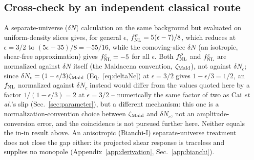\documentclass[aps,prd,twocolumn,superscriptaddress,nofootinbib,longbibliography]{revtex4-2}
\begin{document}
\subsection{Cross-check by an independent classical route}
\label{sec:crosscheck}

A separate-universe ($\delta N$) calculation on the same background but evaluated
on uniform-density slices gives, for general $\epsilon$,
$f_{\rm NL}^\rho=5(\epsilon-7)/8$, which reduces at $\epsilon=3/2$ to
$(5\epsilon-35)/8=-55/16$, while the comoving-slice $\delta N$ (an isotropic,
shear-free approximation) gives $f_{\rm NL}^c=-5$ for all $\epsilon$. Both
$f_{\rm NL}^\rho$ and $f_{\rm NL}^c$ are normalized against $\delta N$ itself
(the Maldacena convention, $\zeta_{\rm Mald}$), not against $\delta N_c$; since
$\delta N_c=(1-\epsilon/3)\zeta_{\rm Mald}$ (Eq.~\eqref{eq:deltaNc}) at
$\epsilon=3/2$ gives $1-\epsilon/3=1/2$, an $f_{\rm NL}$ normalized against
$\delta N_c$ instead would differ from the values quoted here by a factor
$1/(1-\epsilon/3)=2$ at $\epsilon=3/2$ -- numerically the same factor of
two as Cai \textit{et al.}'s slip (Sec.~\ref{sec:parameter}), but a
different mechanism: this one is a normalization-convention choice
between $\zeta_{\rm Mald}$ and $\delta N_c$, not an amplitude-conversion
error, and the coincidence is not pursued further here. Neither
equals the in-in result above. An anisotropic (Bianchi-I) separate-universe
treatment does not close the gap either: its projected shear response is
traceless and supplies no monopole (Appendix~\ref{app:derivation},
Sec.~\ref{app:bianchi}).
\end{document}
